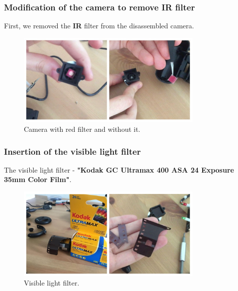 \documentclass{beamer}
\begin{document}
    \begin{frame}
        \frametitle{Modification of the camera to remove IR filter}
        \center First, we removed the \textbf{IR} filter from the disassembled camera.

        \begin{figure}
            \begin{center}
                \includegraphics[width=0.8\textwidth]{Red_filter.jpg}
            \end{center}
            \caption{Camera with red filter and without it.}
            \label{fig:red_filter}
        \end{figure}

    \end{frame}

    \begin{frame}
        \frametitle{Insertion of the visible light filter}
        \center
        The visible light filter - \textbf{"Kodak GC Ultramax 400 ASA 24 Exposure
        35mm Color Film"}.

        \begin{figure}
            \begin{center}
                \includegraphics[width=0.8\textwidth]{Visible_light.jpg}
            \end{center}
            \caption{Visible light filter.}
            \label{fig:VL_filter}
        \end{figure}

    \end{frame}
\end{document}
